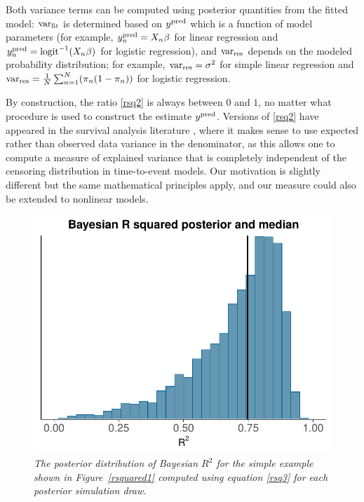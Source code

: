 \documentclass[11pt]{article}
\begin{document}
Both variance terms can be computed using posterior quantities from the fitted model:  ${\rm var}_{\rm fit}$ is determined based on $y^{\rm pred}$ which is a function of model parameters (for example,  $y^{\rm pred}_n=X_n\beta$ for linear regression and $y^{\rm pred}_n=\mbox{logit}^{-1}(X_n\beta)$ for logistic regression), and ${\rm var}_{\rm res}$ depends on the modeled probability distribution; for example, ${\rm var}_{\rm res}= \sigma^2$ for simple linear regression and ${\rm var}_{\rm res}= \frac{1}{N}\sum_{n=1}^N (\pi_n(1-\pi_n))$ for logistic regression.

By construction, the ratio \eqref{rsq2} is always between $0$ and $1$, no matter what procedure is used to construct the estimate
$y^{\rm pred}$.
Versions of \eqref{rsq2} have appeared in the survival analysis
literature \citep{KentOquigley1988, ChoodariRoystonParmar2010},
where it makes sense to use expected rather than observed data variance
in the denominator, as this allows one to compute a measure of explained variance that is completely independent of the censoring distribution in time-to-event models.  Our motivation is slightly different but the same
mathematical principles apply, and our measure could also be extended to nonlinear models.


\begin{figure}
\centerline{\includegraphics[width=.5\textwidth]{bayesr2post.pdf}}
\vspace{-.1in}
\caption{\em The posterior distribution of Bayesian $R^2$ for the simple example shown in Figure~\ref{rsquared1} computed using equation \eqref{rsq3} for each posterior simulation draw.}
\label{bayesr2post}
\end{figure}
\end{document}

